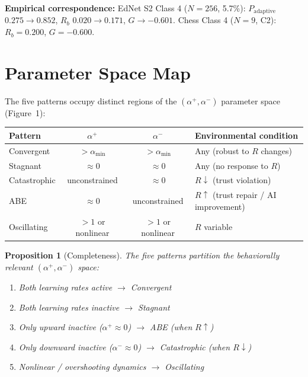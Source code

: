 \documentclass[12pt]{article}
\newtheorem{proposition}{Proposition}
\begin{document}
\textbf{Empirical correspondence:}
EdNet S2 Class 4 ($N=256$, 5.7\%): $P_{\text{adaptive}}$
$0.275 \to 0.852$, $R_b$ $0.020 \to 0.171$, $G \to -0.601$.
Chess Class 4 ($N=9$, C2): $R_b = 0.200$, $G = -0.600$.

\section{Parameter Space Map}

The five patterns occupy distinct regions of the
$(\alpha^+, \alpha^-)$ parameter space (Figure~1):

\begin{center}
\begin{tabular}{lccl}
  \toprule
  \textbf{Pattern} & $\alpha^+$ & $\alpha^-$
    & \textbf{Environmental condition} \\
  \midrule
  Convergent & $> \alpha_{\min}$ & $> \alpha_{\min}$
    & Any (robust to $R$ changes) \\
  Stagnant & $\approx 0$ & $\approx 0$
    & Any (no response to $R$) \\
  Catastrophic & unconstrained & $\approx 0$
    & $R \downarrow$ (trust violation) \\
  ABE & $\approx 0$ & unconstrained
    & $R \uparrow$ (trust repair / AI improvement) \\
  Oscillating & $> 1$ or nonlinear & $> 1$ or nonlinear
    & $R$ variable \\
  \bottomrule
\end{tabular}
\end{center}

\begin{proposition}[Completeness]
  The five patterns partition the behaviorally relevant
  $(\alpha^+, \alpha^-)$ space:
  \begin{enumerate}
    \item Both learning rates active $\to$ Convergent
    \item Both learning rates inactive $\to$ Stagnant
    \item Only upward inactive ($\alpha^+ \approx 0$) $\to$ ABE
      (when $R \uparrow$)
    \item Only downward inactive ($\alpha^- \approx 0$) $\to$ Catastrophic
      (when $R \downarrow$)
    \item Nonlinear / overshooting dynamics $\to$ Oscillating
  \end{enumerate}
\end{proposition}
\end{document}
